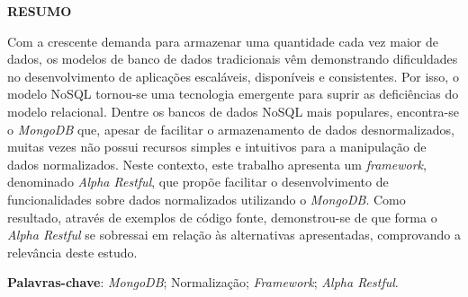 \vfill
\begin{center}
{\textbf{RESUMO}\\}
\end{center}
\noindent

Com a crescente demanda para armazenar uma quantidade cada vez maior de dados, os modelos de banco de dados tradicionais vêm demonstrando dificuldades no desenvolvimento de aplicações escaláveis, disponíveis e consistentes. Por isso, o modelo NoSQL tornou-se uma tecnologia emergente para suprir as deficiências do modelo relacional. Dentre os bancos de dados NoSQL mais populares, encontra-se o \textit{MongoDB} que, apesar de facilitar o armazenamento de dados desnormalizados, muitas vezes não possui recursos simples e intuitivos para a manipulação de dados normalizados. Neste contexto, este trabalho apresenta um \textit{framework}, denominado \textit{Alpha Restful}, que propõe facilitar o desenvolvimento de funcionalidades sobre dados normalizados utilizando o \textit{MongoDB}. Como resultado, através de exemplos de código fonte, demonstrou-se de que forma o \textit{Alpha Restful} se sobressai em relação às alternativas apresentadas, comprovando a relevância deste estudo.

\vspace{\onelineskip}
 \noindent
 \textbf{Palavras-chave}: \textit{MongoDB}; Normalização; \textit{Framework}; \textit{Alpha Restful}.
